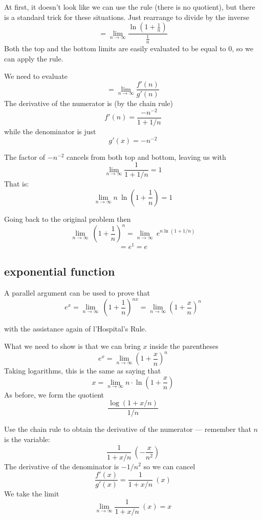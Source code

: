 \documentclass[11pt, oneside]{article}
\begin{document}
At first, it doesn't look like we can use the rule (there is no quotient), but there is a standard trick for these situations.  Just rearrange to divide by the inverse
\[ = \lim_{n \rightarrow \infty} \frac{ \ln (1 + \frac{1}{n})}{\frac{1}{n}}  \]
Both the top and the bottom limits are easily evaluated to be equal to $0$, so we can apply the rule.

We need to evaluate
\[ = \lim_{n \rightarrow \infty} \frac{f'(n)}{g'(n)} \]
The derivative of the numerator is (by the chain rule)
\[ f'(n) = \frac{-n^{-2}}{1 + 1/n} \]
while the denominator is just
\[ g'(x) = -n^{-2} \]

The factor of $-n^{-2}$ cancels from both top and bottom, leaving us with
\[ \lim_{n \rightarrow \infty} \frac{1}{1 + 1/n} = 1  \]
That is:
\[ \lim_{n \rightarrow \infty} n \ \ln (1 + \frac{1}{n}) = 1 \]

Going back to the original problem then
\[ \lim_{n \rightarrow \infty} \ (1 + \frac{1}{n})^n = \lim_{n \rightarrow \infty} \  e^{n \ln(1 + 1/n)} \]
\[ = e^1 = e \]

\subsection*{exponential function}

A parallel argument can be used to prove that
\[ e^x = \lim_{n \rightarrow \infty} \ (1 + \frac{1}{n})^{nx} = \lim_{n \to \infty} (1 + \frac{x}{n})^{n} \]

with the assistance again of l'Hospital's Rule.  
 
 What we need to show is that we can bring $x$ inside the parentheses
\[ e^x =  \lim_{n \to \infty} (1 + \frac{x}{n})^{n} \]
Taking logarithms, this is the same as saying that
\[ x =  \lim_{n \to \infty} n \cdot \ln (1 + \frac{x}{n} ) \]
As before, we form the quotient
\[ \frac{\log (1 + x/n)}{1/n} \]

Use the chain rule to obtain the derivative of the numerator --- remember that $n$ is the variable:
\[ \frac{1}{1 + x/n} \ (- \frac{x}{n^2}) \]
The derivative of the denominator is $-1/n^2$ so we can cancel
\[ \frac{f'(x)}{g'(x)} = \frac{1}{1 + x/n} \ (x) \]
We take the limit
\[ \lim_{n \to \infty} \frac{1}{1 + x/n} \ (x)  = x \]
\end{document}
